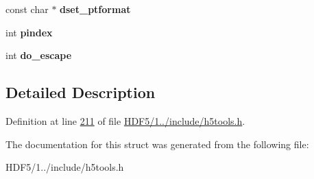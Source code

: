 \begin{DoxyCompactItemize}
\item 
\mbox{\label{structh5tool__format__t_afe14a81126694c02f50eeb369dbd4342}} 
const char $\ast$ {\bfseries dset\+\_\+ptformat}
\item 
\mbox{\label{structh5tool__format__t_ad702db46cb94bc8707094e7b2e1007d4}} 
int {\bfseries pindex}
\item 
\mbox{\label{structh5tool__format__t_af52f436d40b7c46a88d9cb52b3db8067}} 
int {\bfseries do\+\_\+escape}
\end{DoxyCompactItemize}


\subsection{Detailed Description}


Definition at line \hyperlink{_h_d_f5_21_810_81_2include_2h5tools_8h_source_l00211}{211} of file \hyperlink{_h_d_f5_21_810_81_2include_2h5tools_8h_source}{H\+D\+F5/1../include/h5tools.\+h}.



The documentation for this struct was generated from the following file\+:\begin{DoxyCompactItemize}
\item 
H\+D\+F5/1../include/h5tools.\+h\end{DoxyCompactItemize}
